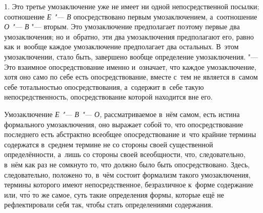 
1. Это третье умозаключение уже не имеет ни одной
непосредственной посылки; соотношение {\em Е "--- В}
опосредствовано первым умозаключением, а~соотношение
{\em О "--- В} "--- вторым. Это умозаключение предполагает поэтому первые два
умозаключения; но и~обратно, эти два умозаключения предполагают его, равно
как и~вообще каждое умозаключение предполагает два остальных. В~этом
умозаключении, стало быть, завершено вообще определение умозаключения.
"--- Это взаимное опосредствование именно и~означает, что каждое
умозаключение, хотя оно само по себе есть опосредствование, вместе с~тем не
является в~самом себе тотальностью опосредствования, а~содержит в~себе
такую непосредственность, опосредствование которой находится вне его.

Умозаключение {\em Е "--- В "--- О,} рассматриваемое в~нём
самом, есть истина формального умозаключения, оно выражает собой то, что
опосредствование последнего есть абстрактно всеобщее опосредствование и~что
крайние термины содержатся в~среднем термине не со стороны своей
существенной определённости, а~лишь со стороны своей всеобщности, что,
следовательно, в~нём как раз не сомкнуто то, что должно было быть
опосредствовано. Здесь, следовательно, положено то, в~чём состоит формализм
такого умозаключения, термины которого имеют
непосредственное, безразличное к~форме содержание или, чт\'{о} то же самое,
суть такие определения формы, которые ещё не рефлектировали себя так, чтобы
стать определениями содержания.


